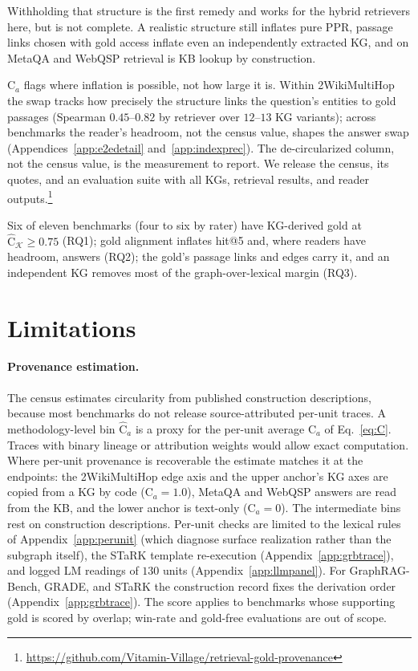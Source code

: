 \documentclass[11pt]{article}
\newcommand{\C}{\mathrm{C}}
\newcommand{\Chat}{\widehat{\mathrm{C}}}
\newcommand{\kg}{\mathcal{K}}
\begin{document}
Withholding that structure is the first remedy and works for the hybrid retrievers here, but is not complete. A realistic structure still inflates pure PPR, passage links chosen with gold access inflate even an independently extracted KG, and on MetaQA and WebQSP retrieval is KB lookup by construction.

$\C_a$ flags where inflation is possible, not how large it is. Within 2WikiMultiHop the swap tracks how precisely the structure links the question's entities to gold passages (Spearman $0.45$--$0.82$ by retriever over $12$--$13$ KG variants); across benchmarks the reader's headroom, not the census value, shapes the answer swap (Appendices~\ref{app:e2edetail} and~\ref{app:indexprec}). The de-circularized column, not the census value, is the measurement to report. We release the census, its quotes, and an evaluation suite with all KGs, retrieval results, and reader outputs.\footnote{\url{https://github.com/Vitamin-Village/retrieval-gold-provenance}}

Six of eleven benchmarks (four to six by rater) have KG-derived gold at $\Chat_{\kg}\geq0.75$ (RQ1); gold alignment inflates hit@5 and, where readers have headroom, answers (RQ2); the gold's passage links and edges carry it, and an independent KG removes most of the graph-over-lexical margin (RQ3).

\section*{Limitations}
\paragraph{Provenance estimation.} The census estimates circularity from published construction descriptions, because most benchmarks do not release source-attributed per-unit traces. A methodology-level bin $\Chat_a$ is a proxy for the per-unit average $\C_a$ of Eq.~\eqref{eq:C}. Traces with binary lineage or attribution weights would allow exact computation. Where per-unit provenance is recoverable the estimate matches it at the endpoints: the 2WikiMultiHop edge axis and the upper anchor's KG axes are copied from a KG by code ($\C_{a}=1.0$), MetaQA and WebQSP answers are read from the KB, and the lower anchor is text-only ($\C_a=0$). The intermediate bins rest on construction descriptions. Per-unit checks are limited to the lexical rules of Appendix~\ref{app:perunit} (which diagnose surface realization rather than the subgraph itself), the STaRK template re-execution (Appendix~\ref{app:grbtrace}), and logged LM readings of $130$ units (Appendix~\ref{app:llmpanel}). For GraphRAG-Bench, GRADE, and STaRK the construction record fixes the derivation order (Appendix~\ref{app:grbtrace}). The score applies to benchmarks whose supporting gold is scored by overlap; win-rate and gold-free evaluations are out of scope.
\end{document}
